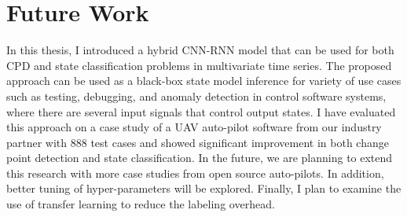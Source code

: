\chapter{Future Work}
In this thesis, I introduced a hybrid CNN-RNN model that can be used for both CPD and state classification problems in multivariate time series. The proposed approach can be used as a black-box state model inference for variety of use cases such as testing, debugging, and anomaly detection in control software systems, where there are several input signals that control output states. I have evaluated this approach on a case study of a UAV auto-pilot software from our industry partner with 888 test cases and showed significant improvement in both change point detection and state classification. In the future, we are planning to extend this research with more case studies from open source auto-pilots. In addition, better tuning of hyper-parameters will be explored. Finally, I plan to examine the use of transfer learning to reduce the labeling overhead.



